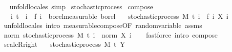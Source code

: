 \begin{isabellebody}
\isadelimproof
\ %
\endisadelimproof
%
\isatagproof
{}\isamarkupfalse%
\ {\isacharparenleft}{\kern0pt}unfold{\isacharunderscore}{\kern0pt}locales{\isacharparenright}{\kern0pt}\ simp%
\endisatagproof
{\isafoldproof}%
%
\isadelimproof
%
\endisadelimproof
\isanewline
\isanewline
{}\isamarkupfalse%
\ stochastic{\isacharunderscore}{\kern0pt}process\isanewline
{}\isanewline
\isanewline
{}\isamarkupfalse%
\ compose{\isacharcolon}{\kern0pt}\isanewline
\ \ \ {\isachardoublequoteopen}{\isasymAnd}i{\isachardot}{\kern0pt}\ t\ {\isasymle}\ i\ {\isasymLongrightarrow}\ f\ i\ {\isasymin}\ borel{\isacharunderscore}{\kern0pt}measurable\ borel{\isachardoublequoteclose}\isanewline
\ \ \ {\isachardoublequoteopen}stochastic{\isacharunderscore}{\kern0pt}process\ M\ t\ {\isacharparenleft}{\kern0pt}{\isasymlambda}i\ {\isasymxi}{\isachardot}{\kern0pt}\ {\isacharparenleft}{\kern0pt}f\ i{\isacharparenright}{\kern0pt}\ {\isacharparenleft}{\kern0pt}X\ i\ {\isasymxi}{\isacharparenright}{\kern0pt}{\isacharparenright}{\kern0pt}{\isachardoublequoteclose}\isanewline
%
\isadelimproof
\ \ %
\endisadelimproof
%
\isatagproof
{}\isamarkupfalse%
\ {\isacharparenleft}{\kern0pt}unfold{\isacharunderscore}{\kern0pt}locales{\isacharparenright}{\kern0pt}\ {\isacharparenleft}{\kern0pt}intro\ measurable{\isacharunderscore}{\kern0pt}compose{\isacharbrackleft}{\kern0pt}OF\ random{\isacharunderscore}{\kern0pt}variable\ assms{\isacharbrackright}{\kern0pt}{\isacharparenright}{\kern0pt}%
\endisatagproof
{\isafoldproof}%
%
\isadelimproof
\ \isanewline
%
\endisadelimproof
\isanewline
{}\isamarkupfalse%
\ norm{\isacharcolon}{\kern0pt}\ {\isachardoublequoteopen}stochastic{\isacharunderscore}{\kern0pt}process\ M\ t\ {\isacharparenleft}{\kern0pt}{\isasymlambda}i\ {\isasymxi}{\isachardot}{\kern0pt}\ norm\ {\isacharparenleft}{\kern0pt}X\ i\ {\isasymxi}{\isacharparenright}{\kern0pt}{\isacharparenright}{\kern0pt}{\isachardoublequoteclose}%
\isadelimproof
\ %
\endisadelimproof
%
\isatagproof
{}\isamarkupfalse%
\ {\isacharparenleft}{\kern0pt}fastforce\ intro{\isacharcolon}{\kern0pt}\ compose{\isacharparenright}{\kern0pt}%
\endisatagproof
{\isafoldproof}%
%
\isadelimproof
%
\endisadelimproof
\isanewline
\isanewline
{}\isamarkupfalse%
\ scaleR{\isacharunderscore}{\kern0pt}right{\isacharcolon}{\kern0pt}\isanewline
\ \ \ {\isachardoublequoteopen}stochastic{\isacharunderscore}{\kern0pt}process\ M\ t\ Y{\isachardoublequoteclose}\isanewline

\end{isabellebody}

